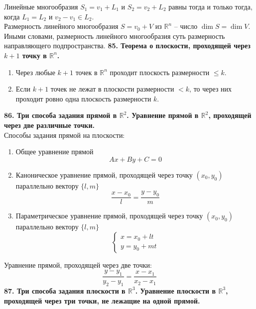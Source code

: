 \documentclass{article}
\begin{document}
   Линейные многообразия $S_1 = v_1 + L_1$ и $S_2 = v_2 + L_2$ равны тогда и только тогда, когда $L_1 = L_2$ и $v_2 - v_1 \in L_2$. \\
   Размерность линейного многообразия $S = v_0 + V$ из $\mathbb{R}^n$ -- число $\dim S = \dim V$. Иными словами, размерность линейного многообразия суть размерность направляющего подпространства.
\newline
\newline
\textbf{85. Теорема о плоскости, проходящей через $k + 1$ точку в $\mathbb{R}^n$.}\\
   \begin{enumerate}
       \item Через любые $k + 1$ точек в $\mathbb{R}^n$ проходит плоскость размерности $\le k$. \\
       \item Если $k + 1$ точек не лежат в плоскости размерности $< k$, то через них проходит ровно одна плоскость размерности $k$.
   \end{enumerate}
\noindent
\textbf{86. Три способа задания прямой в $\mathbb{R}^2$. Уравнение прямой в $\mathbb{R}^2$, проходящей через две различные точки.}\\
   Способы задания прямой на плоскости:
   \begin{enumerate}
       \item Общее уравнение прямой \\
           $$
               Ax + By + C = 0
           $$
       \item Каноническое уравнение прямой, проходящей через точку $(x_0, y_0)$ параллельно вектору $\{l, m\}$ \\
           $$
               \frac{x - x_0}{l} = \frac{y - y_0}{m}
           $$
       \item Параметрическое уравнение прямой, проходящей через точку $(x_0, y_0)$ параллельно вектору $\{l, m\}$ \\
           $$
               \begin{cases}
                   x = x_0 + lt \\
                   y = y_0 + mt
               \end{cases}
           $$
   \end{enumerate}
   Уравнение прямой, проходящей через две точки:
   $$
       \frac{y - y_1}{y_2 - y_1} = \frac{x - x_1}{x_2 - x_1}
   $$
\newline
\newline
\textbf{87. Три способа задания плоскости в $\mathbb{R}^3$. Уравнение плоскости в $\mathbb{R}^3$, проходящей через три точки, не лежащие на одной прямой.}
\end{document}
